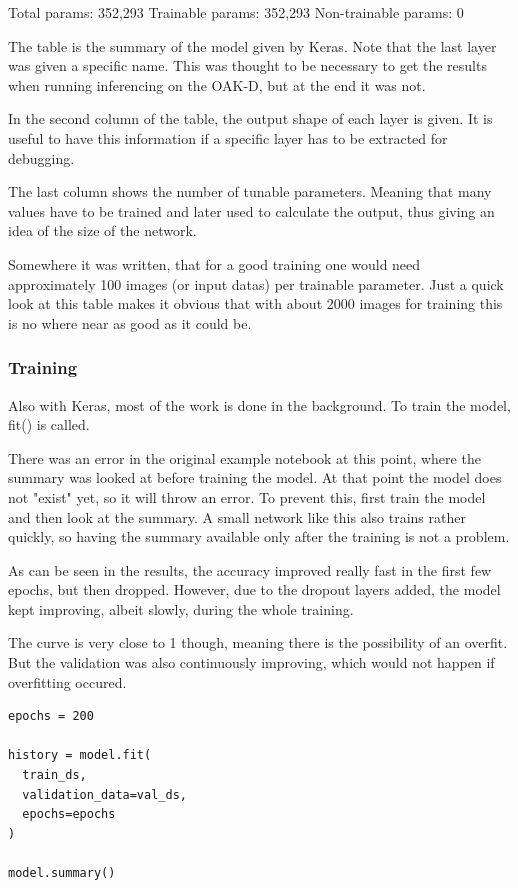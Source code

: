 \documentclass[a4paper,titlepage]{article}
\begin{document}
Total params: 352,293
Trainable params: 352,293
Non-trainable params: 0

The table is the summary of the model given by Keras.
Note that the last layer was given a specific name.
This was thought to be necessary to get the results when running inferencing on the OAK-D, but at the end it was not.

In the second column of the table, the output shape of each layer is given.
It is useful to have this information if a specific layer has to be extracted for debugging.

The last column shows the number of tunable parameters.
Meaning that many values have to be trained and later used to calculate the output, thus giving an idea of the size of the network.

Somewhere it was written, that for a good training one would need approximately 100 images (or input datas) per trainable parameter.
Just a quick look at this table makes it obvious that with about 2000 images for training this is no where near as good as it could be.

\subsubsection{Training}

Also with Keras, most of the work is done in the background.
To train the model, fit() is called.

There was an error in the original example notebook at this point, where the summary was looked at before training the model.
At that point the model does not "exist" yet, so it will throw an error.
To prevent this, first train the model and then look at the summary.
A small network like this also trains rather quickly, so having the summary available only after the training is not a problem.

As can be seen in the results, the accuracy improved really fast in the first few epochs, but then dropped.
However, due to the dropout layers added, the model kept improving, albeit slowly, during the whole training.

The curve is very close to 1 though, meaning there is the possibility of an overfit.
But the validation was also continuously improving, which would not happen if overfitting occured.

\begin{lstlisting}
epochs = 200

history = model.fit(
  train_ds,
  validation_data=val_ds,
  epochs=epochs
)

model.summary()
\end{lstlisting}
\end{document}
